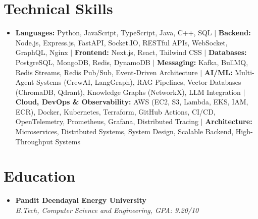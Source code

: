 \documentclass[letterpaper,10pt]{article}
\newcommand{\resumeSubheading}[4]{
\item
\textbf{#1} \hfill \textbf{\small #2} \\
\textit{\small #3} \hfill \textit{\small #4}
\vspace{-4pt}
}
\begin{document}
\vspace{-14pt}
\section{Technical Skills}
\begin{itemize}[leftmargin=*]
\item \textbf{Languages:} Python, JavaScript, TypeScript, Java, C++, SQL $|$
\textbf{Backend:} Node.js, Express.js, FastAPI, Socket.IO, RESTful APIs, WebSocket, GraphQL, Nginx $|$
\textbf{Frontend:} Next.js, React, Tailwind CSS $|$
\textbf{Databases:} PostgreSQL, MongoDB, Redis, DynamoDB $|$
\textbf{Messaging:} Kafka, BullMQ, Redis Streams, Redis Pub/Sub, Event-Driven Architecture $|$
\textbf{AI/ML:} Multi-Agent Systems (CrewAI, LangGraph), RAG Pipelines, Vector Databases (ChromaDB, Qdrant), Knowledge Graphs (NetworkX), LLM Integration $|$
\textbf{Cloud, DevOps \& Observability:} AWS (EC2, S3, Lambda, EKS, IAM, ECR), Docker, Kubernetes, Terraform, GitHub Actions, CI/CD, OpenTelemetry, Prometheus, Grafana, Distributed Tracing $|$
\textbf{Architecture:} Microservices, Distributed Systems, System Design, Scalable Backend, High-Throughput Systems
\end{itemize}

\vspace{-10pt}
\section{Education}
\begin{itemize}[leftmargin=0in, label={}]
\resumeSubheading
{Pandit Deendayal Energy University}{}
{B.Tech, Computer Science and Engineering, GPA: 9.20/10}{}
\end{itemize}
\end{document}
